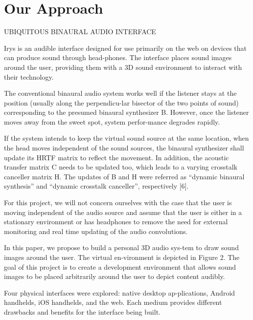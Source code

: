 \newpage                                                 \chapter{Our Approach}


UBIQUITOUS BINAURAL AUDIO INTERFACE

Irys is an audible interface designed for use primarily on the web on devices
that can produce sound through head-phones. The interface places sound images
around the user, providing them with a 3D sound environment to interact with
their technology.

The conventional binaural audio system works well if the listener stays at the
position (usually along the perpendicu-lar bisector of the two points of sound)
corresponding to the presumed binaural synthesizer B. However, once the listener
moves away from the sweet spot, system perfor-mance degrades rapidly.

If the system intends to keep the virtual sound source at the same location,
when the head moves independent of the sound sources, the binaural synthesizer
shall update its HRTF matrix to reflect the movement. In addition, the acoustic
transfer matrix C needs to be updated too, which leads to a varying crosstalk
canceller matrix H. The updates of B and H were referred as “dynamic binaural
synthesis” and “dynamic crosstalk canceller”, respectively [6].

For this project, we will not concern ourselves with the case that the user is
moving independent of the audio source and assume that the user is either in a
stationary environment or has headphones to remove the need for external
monitoring and real time updating of the audio convolutions.

In this paper, we propose to build a personal 3D audio sys-tem to draw sound
images around the user. The virtual en-vironment is depicted in Figure 2.  The
goal of this project is to create a development environment that allows sound
images to be placed arbitrarily around the user to depict content audibly.

Four physical interfaces were explored: native desktop ap-plications, Android
handhelds, iOS handhelds, and the web. Each medium provides different drawbacks
and benefits for the interface being built.\\

